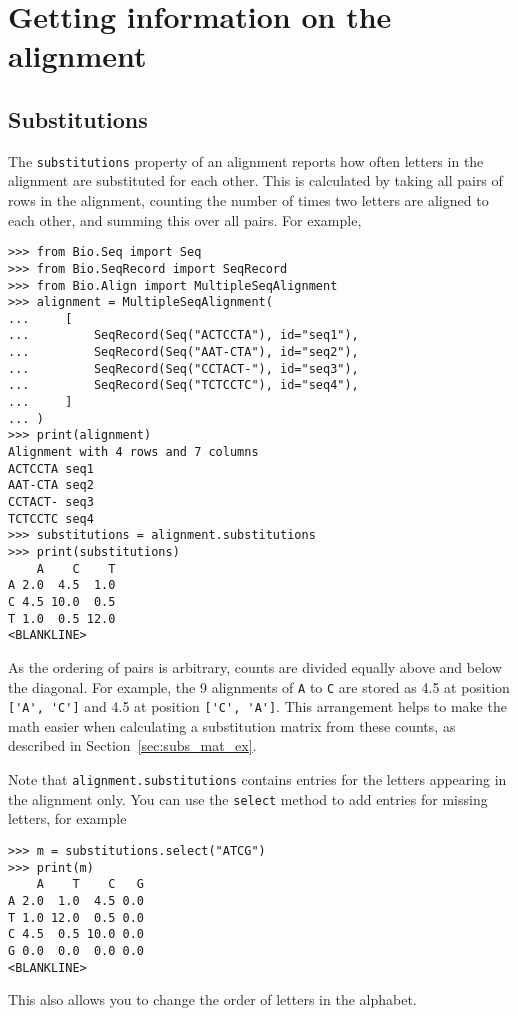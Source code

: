 \section{Getting information on the alignment}

\subsection{Substitutions}

The \verb+substitutions+ property of an alignment reports how often letters in the alignment are substituted for each other. This is calculated by taking all pairs of rows in the alignment, counting the number of times two letters are aligned to each other, and summing this over all pairs. For example,

\begin{verbatim}
>>> from Bio.Seq import Seq
>>> from Bio.SeqRecord import SeqRecord
>>> from Bio.Align import MultipleSeqAlignment
>>> alignment = MultipleSeqAlignment(
...     [
...         SeqRecord(Seq("ACTCCTA"), id="seq1"),
...         SeqRecord(Seq("AAT-CTA"), id="seq2"),
...         SeqRecord(Seq("CCTACT-"), id="seq3"),
...         SeqRecord(Seq("TCTCCTC"), id="seq4"),
...     ]
... )
>>> print(alignment)
Alignment with 4 rows and 7 columns
ACTCCTA seq1
AAT-CTA seq2
CCTACT- seq3
TCTCCTC seq4
>>> substitutions = alignment.substitutions
>>> print(substitutions)
    A    C    T
A 2.0  4.5  1.0
C 4.5 10.0  0.5
T 1.0  0.5 12.0
<BLANKLINE>
\end{verbatim}
As the ordering of pairs is arbitrary, counts are divided equally above and below the diagonal. For example, the 9 alignments of \verb+A+ to \verb+C+ are stored as 4.5 at position \verb+['A', 'C']+ and 4.5  at position \verb+['C', 'A']+. This arrangement helps to make the math easier when calculating a substitution matrix from these counts, as described in Section~\ref{sec:subs_mat_ex}.

Note that \verb+alignment.substitutions+ contains entries for the letters appearing in the alignment only. You can use the \verb+select+ method to add entries for missing letters, for example
\begin{verbatim}
>>> m = substitutions.select("ATCG")
>>> print(m)
    A    T    C   G
A 2.0  1.0  4.5 0.0
T 1.0 12.0  0.5 0.0
C 4.5  0.5 10.0 0.0
G 0.0  0.0  0.0 0.0
<BLANKLINE>
\end{verbatim}
This also allows you to change the order of letters in the alphabet.

